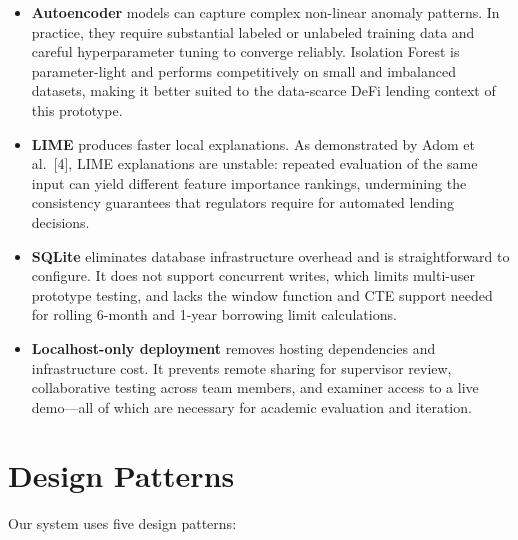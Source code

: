 \documentclass[12pt,a4paper]{report}
\begin{document}
\begin{itemize}[noitemsep]
\item \textbf{Autoencoder} models can capture complex non-linear anomaly patterns. In practice, they require substantial labeled or unlabeled training data and careful hyperparameter tuning to converge reliably. Isolation Forest is parameter-light and performs competitively on small and imbalanced datasets, making it better suited to the data-scarce DeFi lending context of this prototype.

\item \textbf{LIME} produces faster local explanations. As demonstrated by Adom et al.~[4], LIME explanations are unstable: repeated evaluation of the same input can yield different feature importance rankings, undermining the consistency guarantees that regulators require for automated lending decisions.

\item \textbf{SQLite} eliminates database infrastructure overhead and is straightforward to configure. It does not support concurrent writes, which limits multi-user prototype testing, and lacks the window function and CTE support needed for rolling 6-month and 1-year borrowing limit calculations.

\item \textbf{Localhost-only deployment} removes hosting dependencies and infrastructure cost. It prevents remote sharing for supervisor review, collaborative testing across team members, and examiner access to a live demo---all of which are necessary for academic evaluation and iteration.
\end{itemize}


\section{Design Patterns}

Our system uses five design patterns:
\end{document}
